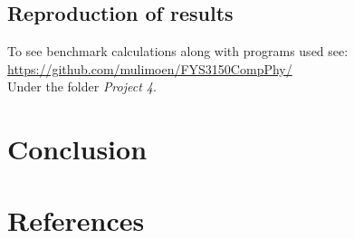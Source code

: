 \documentclass[11pt,a4paper,english]{article}
\numberwithin{equation}{section}
\begin{document}
\subsection{Reproduction of results}

To see benchmark calculations along with programs used see:\\
\url{https://github.com/mulimoen/FYS3150CompPhy/}\\
Under the folder \emph{Project 4}.

\section{Conclusion}

\section{References}
\end{document}
